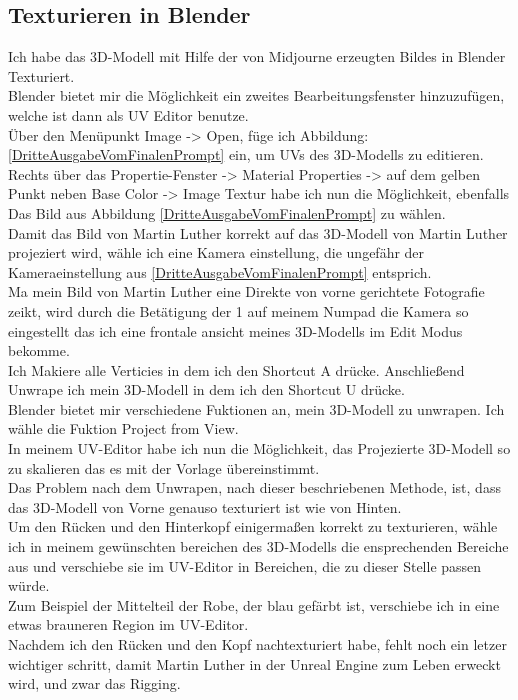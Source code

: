 \subsection{Texturieren in Blender}

Ich habe das 3D-Modell mit Hilfe der von Midjourne erzeugten Bildes in Blender Texturiert.
\\
Blender bietet mir die Möglichkeit ein zweites Bearbeitungsfenster hinzuzufügen, welche ist dann als UV Editor benutze.
\\
Über den Menüpunkt Image -> Open, füge ich Abbildung: \ref{DritteAusgabeVomFinalenPrompt} ein, um UVs des 3D-Modells zu editieren.
\\
Rechts über das Propertie-Fenster -> Material Properties -> auf dem gelben Punkt neben Base Color -> Image Textur habe ich nun die Möglichkeit, ebenfalls Das Bild aus Abbildung \ref{DritteAusgabeVomFinalenPrompt} zu wählen.
\\
Damit das Bild von Martin Luther korrekt auf das 3D-Modell von Martin Luther projeziert wird, wähle ich eine Kamera einstellung, die ungefähr der Kameraeinstellung aus \ref{DritteAusgabeVomFinalenPrompt} entsprich.
\\
Ma mein Bild von Martin Luther eine Direkte von vorne gerichtete Fotografie zeikt, wird durch die Betätigung der 1 auf meinem Numpad die Kamera so eingestellt das ich eine frontale ansicht meines 3D-Modells im Edit Modus bekomme.
\\
Ich Makiere alle Verticies in dem ich den Shortcut A drücke. Anschließend Unwrape ich mein 3D-Modell in dem ich den Shortcut U drücke.
\\
Blender bietet mir verschiedene Fuktionen an, mein 3D-Modell zu unwrapen. Ich wähle die Fuktion Project from View.
\\
In meinem UV-Editor habe ich nun die Möglichkeit, das Projezierte 3D-Modell so zu skalieren das es mit der Vorlage übereinstimmt.
\\
Das Problem nach dem Unwrapen, nach dieser beschriebenen Methode, ist, dass das 3D-Modell von Vorne genauso texturiert ist wie von Hinten.
\\
Um den Rücken und den Hinterkopf einigermaßen korrekt zu texturieren, wähle ich in meinem gewünschten bereichen des 3D-Modells die ensprechenden Bereiche aus und verschiebe sie im UV-Editor in Bereichen, die zu dieser Stelle passen würde.
\\
Zum Beispiel der Mittelteil der Robe, der blau gefärbt ist, verschiebe ich in eine etwas brauneren Region im UV-Editor.
\\
Nachdem ich den Rücken und den Kopf nachtexturiert habe, fehlt noch ein letzer wichtiger schritt, damit Martin Luther in der Unreal Engine zum Leben erweckt wird, und zwar das Rigging.

